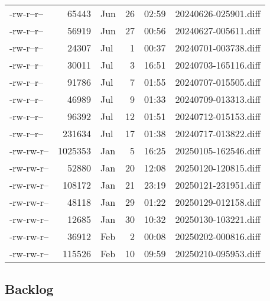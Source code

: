 \documentclass[a4paper]{article}
\begin{document}
\begin{longtable}{lrlrrl}
-rw-r--r-- & 65443 & Jun & 26 & 02:59 & 20240626-025901.diff\\[0pt]
-rw-r--r-- & 56919 & Jun & 27 & 00:56 & 20240627-005611.diff\\[0pt]
-rw-r--r-- & 24307 & Jul & 1 & 00:37 & 20240701-003738.diff\\[0pt]
-rw-r--r-- & 30011 & Jul & 3 & 16:51 & 20240703-165116.diff\\[0pt]
-rw-r--r-- & 91786 & Jul & 7 & 01:55 & 20240707-015505.diff\\[0pt]
-rw-r--r-- & 46989 & Jul & 9 & 01:33 & 20240709-013313.diff\\[0pt]
-rw-r--r-- & 96392 & Jul & 12 & 01:51 & 20240712-015153.diff\\[0pt]
-rw-r--r-- & 231634 & Jul & 17 & 01:38 & 20240717-013822.diff\\[0pt]
-rw-rw-r-- & 1025353 & Jan & 5 & 16:25 & 20250105-162546.diff\\[0pt]
-rw-rw-r-- & 52880 & Jan & 20 & 12:08 & 20250120-120815.diff\\[0pt]
-rw-rw-r-- & 108172 & Jan & 21 & 23:19 & 20250121-231951.diff\\[0pt]
-rw-rw-r-- & 48118 & Jan & 29 & 01:22 & 20250129-012158.diff\\[0pt]
-rw-rw-r-- & 12685 & Jan & 30 & 10:32 & 20250130-103221.diff\\[0pt]
-rw-rw-r-- & 36912 & Feb & 2 & 00:08 & 20250202-000816.diff\\[0pt]
-rw-rw-r-- & 115526 & Feb & 10 & 09:59 & 20250210-095953.diff\\[0pt]
\end{longtable}
\rmfamily

\subsection{Backlog}
\label{sec:orge8b75e7}
\end{document}
